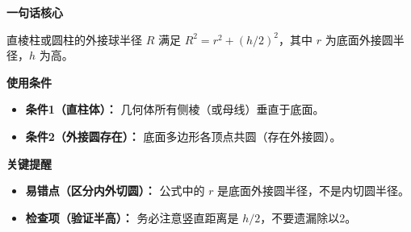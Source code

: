\begin{summarybox}
	\textbf{\textcolor{CSummary}{一句话核心}}

	直棱柱或圆柱的外接球半径 $R$ 满足 $R^2 = r^2 + (h/2)^2$，其中 $r$ 为底面外接圆半径，$h$ 为高。

	\medskip
	\textbf{\textcolor{CSummary}{使用条件}}
	\begin{itemize}[leftmargin=*, itemsep=0.5em, topsep=0.4em]
		\item \textbf{条件1（直柱体）：} 几何体所有侧棱（或母线）垂直于底面。
		\item \textbf{条件2（外接圆存在）：} 底面多边形各顶点共圆（存在外接圆）。
	\end{itemize}

	\medskip
	\textbf{\textcolor{CSummary}{关键提醒}}
	\begin{itemize}[leftmargin=*, itemsep=0.5em, topsep=0.4em]
		\item \textbf{易错点（区分内外切圆）：} 公式中的 $r$ 是底面外接圆半径，不是内切圆半径。
		\item \textbf{检查项（验证半高）：} 务必注意竖直距离是 $h/2$，不要遗漏除以2。
	\end{itemize}
\end{summarybox}
